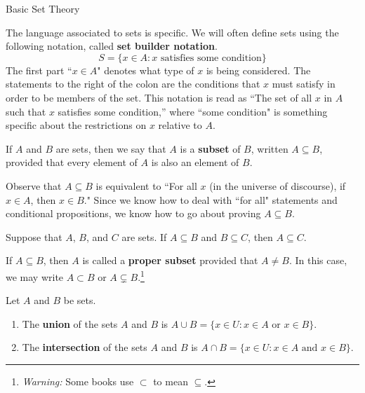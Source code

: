 \begin{section}{Basic Set Theory}
\begin{definition} 
The language associated to sets is specific.  We will often define sets using the following notation, called \textbf{set builder notation}.
\[
S=\{x \in A: x \mbox{ satisfies some condition}\}
\]
The first part ``$x \in A$" denotes what type of $x$ is being considered.  The statements to the right of the colon are the conditions that $x$ must satisfy in order to be members of the set.  This notation is read as ``The set of all $x$ in $A$ such that $x$ satisfies some condition,'' where ``some condition" is something specific about the restrictions on $x$ relative to $A$.
\end{definition}

\begin{definition}
If $A$ and $B$ are sets, then we say that $A$ is a \textbf{subset} of $B$, written $A\subseteq B$, provided that every element of $A$ is also an element of $B$.
\end{definition}

\begin{remark}
Observe that $A\subseteq B$ is equivalent to ``For all $x$ (in the universe of discourse), if $x\in A$, then $x\in B$."  Since we know how to deal with ``for all" statements and conditional propositions, we know how to go about proving $A\subseteq B$.
\end{remark}

\begin{theorem}
Suppose that $A$, $B$, and $C$ are sets.  If $A\subseteq B$ and $B\subseteq C$, then $A\subseteq C$.
\end{theorem}

\begin{definition}
If $A\subseteq B$, then $A$ is called a \textbf{proper subset} provided that $A\neq B$.  In this case, we may write $A\subset B$ or $A\subsetneq B$.\footnote{\emph{Warning:} Some books use $\subset$ to mean $\subseteq$.}
\end{definition}

\begin{definition}
Let $A$ and $B$ be sets.
\begin{enumerate}
\item The \textbf{union} of the sets $A$ and $B$ is $A \cup B =\{x\in U : x\in A \mbox{ or } x\in B \}$.

\item The \textbf{intersection} of the sets $A$ and $B$ is $A \cap B =\{x\in U : x\in A \mbox{ and } x\in B \}$.


\end{enumerate}
\end{definition}
\end{section}
